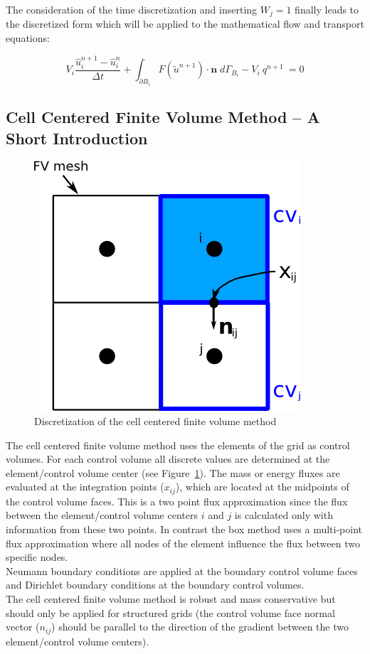 The consideration of the time discretization and inserting $W_j = 1$ finally
leads to the discretized form which will be applied to the mathematical
flow and transport equations:

\begin{equation}
\label{eq:discfin}
	V_i \frac{\hat u_i^{n+1} - \hat u_i^{n}}{\Delta t}
	+ \int_{\partial B_i}  F(\tilde u^{n+1}) \cdot \mathbf n
	\;  d{\varGamma}_{B_i} - V_i \: q^{n+1} \: = 0
\end{equation}

\subsection{Cell Centered Finite Volume Method -- A Short Introduction}\label{cc}

\begin{figure} [ht]
\centering
\includegraphics[width=0.4\linewidth,keepaspectratio]{PNG/cc_disc.png}
\caption{\label{pc:cc} Discretization of the cell centered finite volume method}
\end{figure}

The cell centered finite volume method uses the elements of the grid as control volumes.
For each control volume all discrete values are determined at the element/control
volume center (see Figure~\ref{pc:cc}).
The mass or energy fluxes are evaluated at the integration points ($x_{ij}$),
which are located at the midpoints of the control
volume faces. This is a two point flux approximation since the flux between
the element/control volume centers $i$ and $j$ is calculated
only with information from these two points. In contrast the box method uses
a multi-point flux approximation where all nodes of the
element influence the flux between two specific nodes. \\
Neumann boundary conditions are applied at the boundary control volume faces
and Dirichlet boundary conditions at the boundary control volumes. \\
The cell centered finite volume method is robust and mass conservative but
should only be applied for structured grids
(the control volume face normal vector ($n_{ij}$) should be parallel to the
direction of the gradient between the two element/control
volume centers).


